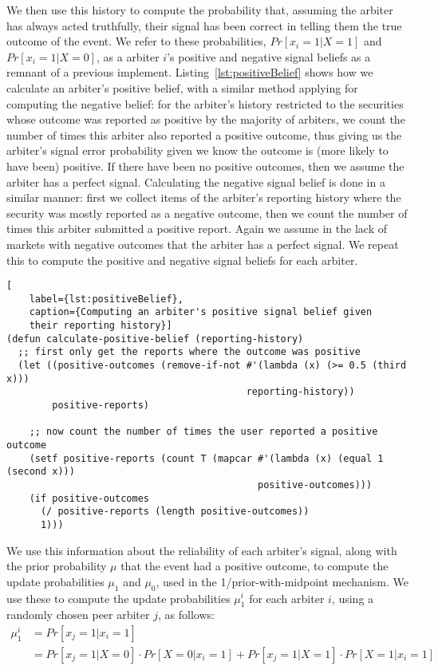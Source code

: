 We then use this history to compute the probability that, assuming the arbiter
has always acted truthfully, their signal has been correct in telling them the
true outcome of the event. We refer to these probabilities, $Pr[x_i=1|X=1]$ and
$Pr[x_i=1|X=0]$, as a arbiter $i$'s positive and negative signal beliefs as a
remnant of a previous implement. Listing~\ref{lst:positiveBelief} shows how we
calculate an arbiter's positive belief, with a similar method applying for
computing the negative belief: for the arbiter's history restricted to the
securities whose outcome was reported as positive by the majority of arbiters,
we count the number of times this arbiter also reported a positive outcome,
thus giving us the arbiter's signal error probability given we know the outcome
is (more likely to have been) positive. If there have been no positive
outcomes, then we assume the arbiter has a perfect signal. Calculating the
negative signal belief is done in a similar manner: first we collect items of
the arbiter's reporting history where the security was mostly reported as a
negative outcome, then we count the number of times this arbiter submitted a
positive report. Again we assume in the lack of markets with negative outcomes
that the arbiter has a perfect signal. We repeat this to compute the positive
and negative signal beliefs for each arbiter.

\begin{lstlisting}[
	label={lst:positiveBelief},
	caption={Computing an arbiter's positive signal belief given
	their reporting history}]
(defun calculate-positive-belief (reporting-history)
  ;; first only get the reports where the outcome was positive
  (let ((positive-outcomes (remove-if-not #'(lambda (x) (>= 0.5 (third x)))
                                          reporting-history))
        positive-reports)

    ;; now count the number of times the user reported a positive outcome
    (setf positive-reports (count T (mapcar #'(lambda (x) (equal 1 (second x)))
                                            positive-outcomes)))
    (if positive-outcomes
      (/ positive-reports (length positive-outcomes))
      1)))
\end{lstlisting}

We use this information about the reliability of each arbiter's signal, along
with the prior probability $\mu$ that the event had a positive outcome, to
compute the update probabilities $\mu_1$ and $\mu_0$, used in the
1/prior-with-midpoint mechanism. We use these to compute the update
probabilities $\mu_1^i$ for each arbiter $i$, using a randomly chosen peer
arbiter $j$, as follows:
%
\begin{equation}
	\label{eq:updateProbabilities}
	\begin{aligned}
		\mu_1^i & = Pr[x_j=1|x_i=1] \\
		& = Pr[x_j=1|X=0] \cdot Pr[X=0|x_i=1] + Pr[x_j=1|X=1] \cdot Pr[X=1|x_i=1]
	\end{aligned}
\end{equation}

